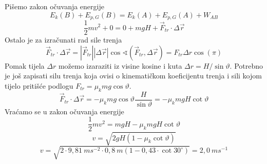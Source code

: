 

Pišemo zakon očuvanja energije
$$ E_k(B) + E_{p,G}(B)  = E_k(A) + E_{p,G}(A) + W_{AB}$$
$$ \frac{1}{2}mv^2 + 0 = 0 + mgH + \vec{F}_{tr}\cdot\Delta\vec{r}  $$
Ostalo je za izračunati rad sile trenja
$$\vec{F}_{tr}\cdot\Delta\vec{r}=|\vec{F}_{tr}||\Delta\vec{r}|\cos \sphericalangle (\vec{F}_{tr},\Delta\vec{r})
=F_{tr}\Delta r\cos(\pi)$$
Pomak tijela $\Delta r$ možemo izaraziti iz visine kosine i kuta $\Delta r=H/\sin\vartheta$. Potrebno je 
još zapisati silu trenja koja ovisi o kinematičkom koeficijentu trenja i sili kojom tijelo pritišće podlogu
$F_{tr} = \mu_kmg\cos\vartheta $.
$$\vec{F}_{tr}\cdot\Delta\vec{r}= - \mu_kmg\cos\vartheta\frac{H}{\sin\vartheta}= - \mu_k mgH\cot\vartheta$$
Vraćamo se u zakon očuvanja energije
$$ \frac{1}{2}mv^2 = mgH - \mu_k mgH\cot\vartheta  $$
$$ v=\sqrt{2gH(1 - \mu_k\cot\vartheta)}$$
$$ v = \sqrt{2 \cdot 9,81 \ ms^{-2} \cdot 0,8 \ m (1-0,43\cdot\cot30^\circ)}=2,0 \ ms^{-1} $$


